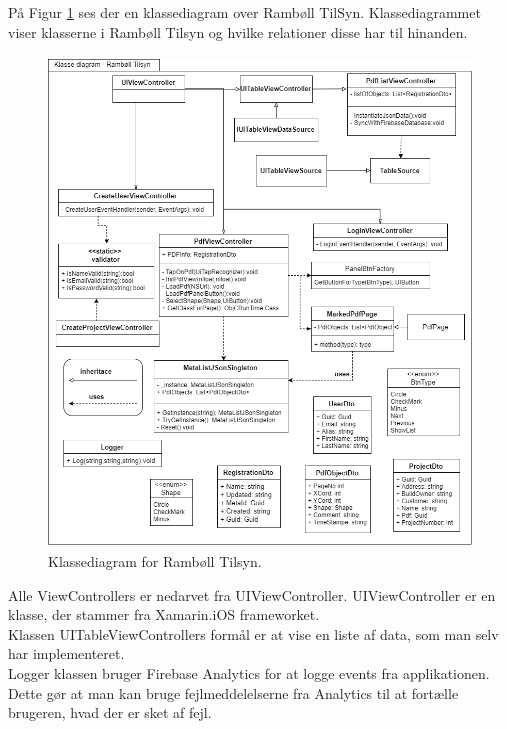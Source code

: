 På Figur \ref{fig:KlasseDiagram} ses der en klassediagram over Rambøll TilSyn. Klassediagrammet viser klasserne i Rambøll Tilsyn og hvilke relationer disse har til hinanden.
\begin{figure}[H] %
	\centering
	\includegraphics[height=13cm, width=17cm]{Arkitektur/KlasseDiagram}
	\caption{Klassediagram for Rambøll Tilsyn.}
	\label{fig:KlasseDiagram}
\end{figure}


Alle ViewControllers er nedarvet fra UIViewController\cite{UIViewController}. UIViewController er en klasse, der stammer fra Xamarin.iOS frameworket. \\
Klassen UITableViewControllers formål er at vise en liste af data, som man selv har implementeret. \\
Logger klassen bruger Firebase Analytics\cite{FirebaseAnalytic} for at logge events fra applikationen. Dette gør at man kan bruge fejlmeddelelserne fra Analytics til at fortælle brugeren, hvad der er sket af fejl.  
